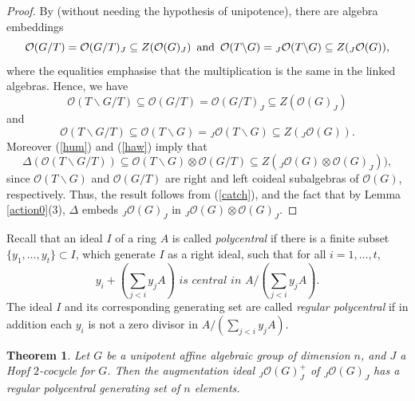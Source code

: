 \documentclass{amsart}
\numberwithin{equation}{section}
\newtheorem{theorem}{Theorem}[section]
\theoremstyle{definition}
\begin{document}
\begin{proof} 
By \cite[Theorem 3.5]{G1} (without needing the hypothesis of unipotence), there are algebra embeddings 
$$\mathcal{O}(G/T) = \mathcal{O}(G/T)_J \subseteq Z(\mathcal{O}(G)_J)\,\,\,{\rm and}\,\,\,\mathcal{O}(T \backslash G) = {}_J\mathcal{O}(T \backslash G)  \subseteq Z({}_J \mathcal{O}(G)),$$ where the equalities emphasise that the multiplication is the same in the linked algebras. Hence, we have
\begin{equation}\label{hum} 
\mathcal{O}(T\backslash G / T) \subseteq \mathcal{O}(G/T) = \mathcal{O}(G/T)_J \subseteq Z(\mathcal{O}(G)_J) 
\end{equation}
and
\begin{equation}\label{haw} \mathcal{O}(T\backslash G / T) \subseteq  \mathcal{O}(T \backslash G) ={}_J\mathcal{O}(T \backslash G) \subseteq Z(_J \mathcal{O}(G)). 
\end{equation}
Moreover (\ref{hum}) and (\ref{haw}) imply that
\begin{equation}\label{catch}  
\Delta (\mathcal{O}(T\backslash G / T)) \subseteq \mathcal{O}(T \backslash G) \otimes \mathcal{O}(G/T) \subseteq Z({}_J\mathcal{O}(G) \otimes \mathcal{O}(G)_J)),
\end{equation}
since $\mathcal{O}(T\backslash G)$ and $\mathcal{O}(G/T)$ are right and  left coideal subalgebras of $\mathcal{O}(G)$, respectively. Thus, the result follows from (\ref{catch}), and the fact that by Lemma \ref{action0}(3), $\Delta$ embeds ${}_J\mathcal{O}(G)_J$ in ${}_J\mathcal{O}(G) \otimes \mathcal{O}(G)_J$. 
\end{proof}

Recall that an ideal $I$ of a ring $A$ is called \emph{polycentral} if there is a finite subset $\{y_1, \ldots , y_t\}\subset I$, which generate $I$ as a right ideal, such that for all $i = 1, \ldots , t$,
$$ y_i + \left(\sum_{j < i} y_j A\right) \textit{ is central in } A/\left(\sum_{j < i}y_j A\right). $$
The ideal $I$ and its corresponding generating set are called \emph{regular polycentral} if in addition each $y_i$ is not a zero divisor in $A/(\sum_{j<i} y_j A)$.

\begin{theorem}\label{augcent} 
Let $G$ be a unipotent affine algebraic group of dimension $n$, and $J$ a Hopf $2$-cocycle for $G$. Then the augmentation ideal ${}_J\mathcal{O}(G)_J^+$ of ${}_J\mathcal{O}(G)_J$ has a regular polycentral generating set of $n$ elements.
\end{theorem}
\end{document}
